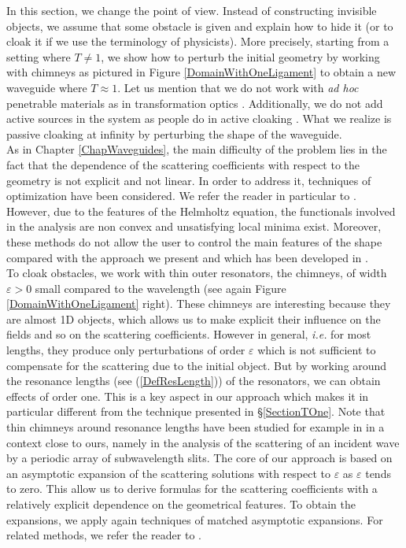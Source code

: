 \documentclass[11pt,a4paper]{report}
\newcommand{\eps}{\varepsilon}
\begin{document}
\noindent In this section, we change the point of view. Instead of constructing invisible objects, we assume that some obstacle is given and explain how to hide it (or to cloak it if we use the terminology of physicists). More precisely, starting from a setting where $T\ne1$, we show how to perturb the initial geometry by working with chimneys as pictured in Figure \ref{DomainWithOneLigament} to obtain a new waveguide where $T\approx 1$. Let us mention that we do not work with \textit{ad hoc} penetrable materials as in transformation optics \cite{PeSS06,Leon06,ChCh10}. Additionally, we do not add active sources in the system as people do in active cloaking \cite{Mill06,CDGG21}. What we realize is passive cloaking at infinity by perturbing the shape of the waveguide. \\
\newline
As in Chapter \ref{ChapWaveguides}, the main difficulty of the problem lies in the fact that the dependence of the scattering coefficients with respect to the geometry is not explicit and not linear. In order to address it, techniques of optimization have been considered. We refer the reader in particular to \cite{AlLS17,LDOHG19,LGHDO19}. However, due to the features of the Helmholtz equation, the functionals involved in the analysis are non convex and unsatisfying local minima exist. Moreover, these methods do not allow the user to control the main features of the shape compared with the approach we present and which has been developed in \cite{ChHN22}.\\
\newline
To cloak obstacles, we work with thin outer resonators, the chimneys, of width $\eps>0$ small compared to the wavelength (see again Figure \ref{DomainWithOneLigament} right). These chimneys are interesting because they are almost 1D objects, which allows us to make explicit their influence on the fields and so on the scattering coefficients. However in general, \textit{i.e.} for most lengths, they produce only perturbations of order $\eps$ which is not sufficient to compensate for the scattering due to the initial object. But by working around the resonance lengths (see (\ref{DefResLength})) of the resonators, we can obtain effects of order one. This is a key aspect in our approach which makes it in particular different from the technique presented in \S\ref{SectionTOne}. Note that thin chimneys around resonance lengths have been studied for example in \cite{Krieg,BoTr10,LiZh17,LiSZ19} in a context close to ours, namely in the analysis of the scattering of an incident wave by a periodic array of subwavelength slits. The core of our approach is based on an asymptotic expansion of the scattering solutions with respect to $\eps$ as $\eps$ tends to zero. This allow us to derive formulas for the scattering coefficients with a relatively explicit dependence on the geometrical features. To obtain the expansions, we apply again techniques of matched asymptotic expansions. For related methods, we refer the reader to \cite{Beal73,KoMM94}.\\
\end{document}
